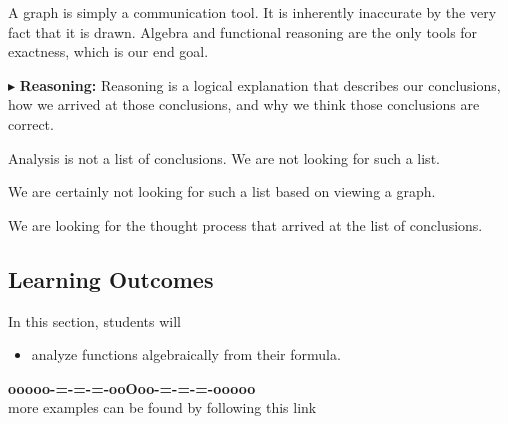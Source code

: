 \documentclass{ximera}
\begin{document}
A graph is simply a communication tool.  It is inherently inaccurate by the very fact that it is drawn.  Algebra and functional reasoning are the only tools for exactness, which is our end goal. 



$\blacktriangleright$ \textbf{\textcolor{red!70!black}{Reasoning:}} Reasoning is a logical explanation that describes our conclusions, how we arrived at those conclusions, and why we think those conclusions are correct. 

Analysis is not a list of conclusions. We are not looking for such a list. 

We are certainly not looking for such a list based on viewing a graph. 

We are looking for the thought process that arrived at the list of conclusions. 





\subsection*{Learning Outcomes}


\begin{sectionOutcomes}
In this section, students will 

\begin{itemize}
\item analyze functions algebraically from their formula.
\end{itemize}
\end{sectionOutcomes}






















\begin{onlineOnly}
\begin{center}
\textbf{\textcolor{green!50!black}{ooooo-=-=-=-ooOoo-=-=-=-ooooo}} \\

more examples can be found by following this link\\ 

\end{center}
\end{onlineOnly}
\end{document}
